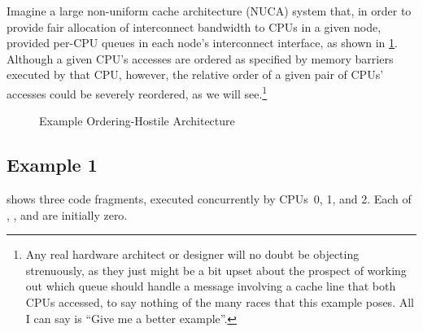 \QuickQuizEnd

Imagine a large non-uniform cache architecture (NUCA) system that,
in order to provide fair allocation
of interconnect bandwidth to CPUs in a given node, provided per-CPU
queues in each node's interconnect interface, as shown in
\cref{fig:app:whymb:Example Ordering-Hostile Architecture}.
Although a given CPU's accesses are ordered as specified by memory
barriers executed by that CPU, however, the relative order of a
given pair of CPUs' accesses could be severely reordered,
as we will see.\footnote{
	Any real hardware architect or designer will no doubt be
	objecting strenuously,
	as they just might be a bit upset about the prospect of working
	out which queue should handle a message involving a cache line
	that both CPUs accessed, to say nothing of the many races that
	this example poses.
	All I can say is ``Give me a better example''.}

\begin{figure}[htb]
\centering
{}
\caption{Example Ordering-Hostile Architecture}
\label{fig:app:whymb:Example Ordering-Hostile Architecture}
\end{figure}

\subsection{Example 1}
\label{sec:app:whymb:Example 1}

shows three code fragments, executed concurrently by CPUs~0, 1, and 2.
Each of , , and  are initially zero.


